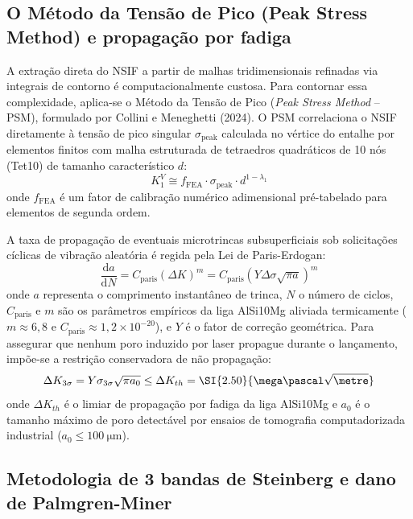 \subsection{O Método da Tensão de Pico (Peak Stress Method) e propagação por fadiga}
\label{subsec:psm-paris}

A extração direta do NSIF a partir de malhas tridimensionais refinadas via integrais de contorno é computacionalmente custosa. Para contornar essa complexidade, aplica-se o Método da Tensão de Pico (\textit{Peak Stress Method} -- PSM), formulado por Collini e Meneghetti (2024). O PSM correlaciona o NSIF diretamente à tensão de pico singular $\sigma_{\text{peak}}$ calculada no vértice do entalhe por elementos finitos com malha estruturada de tetraedros quadráticos de 10 nós (Tet10) de tamanho característico $d$:
\begin{equation}
  K_1^V \cong f_{\text{FEA}} \cdot \sigma_{\text{peak}} \cdot d^{1-\lambda_1}
  \label{eq:psm-teoria}
\end{equation}
onde $f_{\text{FEA}}$ é um fator de calibração numérico adimensional pré-tabelado para elementos de segunda ordem.

A taxa de propagação de eventuais microtrincas subsuperficiais sob solicitações cíclicas de vibração aleatória é regida pela Lei de Paris-Erdogan:
\begin{equation}
  \frac{\mathrm{d}a}{\mathrm{d}N} = C_{\text{paris}} (\Delta K)^m = C_{\text{paris}} \left( Y \Delta\sigma \sqrt{\pi a} \right)^m
  \label{eq:paris-teoria}
\end{equation}
onde $a$ representa o comprimento instantâneo de trinca, $N$ o número de ciclos, $C_{\text{paris}}$ e $m$ são os parâmetros empíricos da liga AlSi10Mg aliviada termicamente ($m \approx 6{,}8$ e $C_{\text{paris}} \approx 1{,}2 \times 10^{-20}$), e $Y$ é o fator de correção geométrica. Para assegurar que nenhum poro induzido por laser propague durante o lançamento, impõe-se a restrição conservadora de não propagação:
\begin{equation}
  \Delta K_{3\sigma} = Y \sigma_{3\sigma} \sqrt{\pi a_0} \le \Delta K_{th} = \SI{2.50}{\mega\pascal\sqrt{\metre}}
  \label{eq:limiar-fadiga}
\end{equation}
onde $\Delta K_{th}$ é o limiar de propagação por fadiga da liga AlSi10Mg e $a_0$ é o tamanho máximo de poro detectável por ensaios de tomografia computadorizada industrial ($a_0 \le \SI{100}{\micro\metre}$).

\subsection{Metodologia de 3 bandas de Steinberg e dano de Palmgren-Miner}
\label{subsec:steinberg-teoria}

